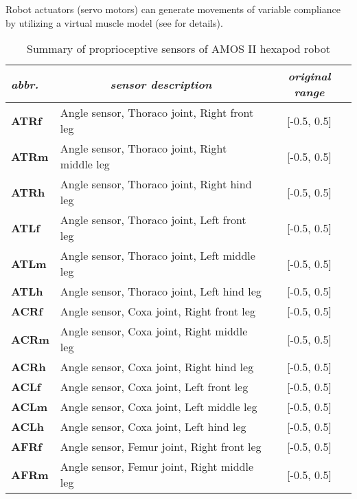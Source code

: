 Robot actuators (servo motors) can generate movements of variable compliance by utilizing a virtual muscle model (see \cite{misc:amosii} for details). 

\begin{table}[H]
\centering
\caption{Summary of proprioceptive sensors of AMOS II hexapod robot}
\label{tab:proprioceptors}
\begin{tabular}{|l|l|c|}
\hline
\textit{abbr.} & \multicolumn{1}{c|}{\textit{sensor description}} & \textit{original range} \\ \hline
\textbf{ATRf}         & Angle sensor, Thoraco joint, Right front leg     & {[}-0.5, 0.5{]}         \\ \hline
\textbf{ATRm}         & Angle sensor, Thoraco joint, Right middle leg    & {[}-0.5, 0.5{]}         \\ \hline
\textbf{ATRh}         & Angle sensor, Thoraco joint, Right hind leg      & {[}-0.5, 0.5{]}         \\ \hline
\textbf{ATLf}         & Angle sensor, Thoraco joint, Left front leg      & {[}-0.5, 0.5{]}         \\ \hline
\textbf{ATLm}         & Angle sensor, Thoraco joint, Left middle leg     & {[}-0.5, 0.5{]}         \\ \hline
\textbf{ATLh}         & Angle sensor, Thoraco joint, Left hind leg       & {[}-0.5, 0.5{]}         \\ \hline
\textbf{ACRf}         & Angle sensor, Coxa joint, Right front leg        & {[}-0.5, 0.5{]}         \\ \hline
\textbf{ACRm}         & Angle sensor, Coxa joint, Right middle leg       & {[}-0.5, 0.5{]}         \\ \hline
\textbf{ACRh}         & Angle sensor, Coxa joint, Right hind leg         & {[}-0.5, 0.5{]}         \\ \hline
\textbf{ACLf}         & Angle sensor, Coxa joint, Left front leg         & {[}-0.5, 0.5{]}         \\ \hline
\textbf{ACLm}         & Angle sensor, Coxa joint, Left middle leg        & {[}-0.5, 0.5{]}         \\ \hline
\textbf{ACLh}         & Angle sensor, Coxa joint, Left hind leg          & {[}-0.5, 0.5{]}         \\ \hline
\textbf{AFRf}         & Angle sensor, Femur joint, Right front leg       & {[}-0.5, 0.5{]}         \\ \hline
\textbf{AFRm}         & Angle sensor, Femur joint, Right middle leg      & {[}-0.5, 0.5{]}         \\ \hline

\end{tabular}
\end{table}
